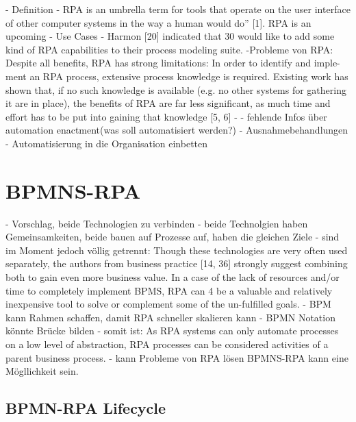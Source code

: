 - Definition
- RPA is an umbrella term for tools that operate on
the user interface of other computer systems in the way a human would do” [1].
RPA is an upcoming
- Use Cases
- Harmon [20] indicated that 30%
would like to add some kind of RPA capabilities to their process modeling suite. 
-Probleme von RPA:
Despite all beneﬁts, RPA has strong limitations: In order to identify and imple-
ment an RPA process, extensive process knowledge is required. Existing work
has shown that, if no such knowledge is available (e.g. no other systems for
gathering it are in place), the beneﬁts of RPA are far less signiﬁcant, as much
time and eﬀort has to be put into gaining that knowledge [5, 6]
- - fehlende Infos über automation enactment(was soll automatisiert werden?)
- Ausnahmebehandlungen
- Automatisierung in die Organisation einbetten

    \section{BPMNS-RPA}
- Vorschlag, beide Technologien zu verbinden
- beide Technolgien haben Gemeinsamkeiten, beide bauen auf Prozesse auf, haben die gleichen Ziele
- sind im Moment jedoch völlig getrennt: Though these technologies are very often used separately, the authors from business practice [14, 36] strongly suggest combining both to gain even more business value. In a case of the lack of resources and/or time to completely implement BPMS, RPA can
4 be a valuable and relatively inexpensive tool to solve or complement some of the un-fulfilled goals.
- BPM kann Rahmen schaffen, damit RPA schneller skalieren kann
- BPMN Notation könnte Brücke bilden
- somit ist: As RPA systems can only automate processes on a low level
of abstraction, RPA processes can be considered activities of a parent business
process.
- kann Probleme von RPA lösen
BPMNS-RPA kann eine Mögllichkeit sein.
\subsection{BPMN-RPA Lifecycle}
